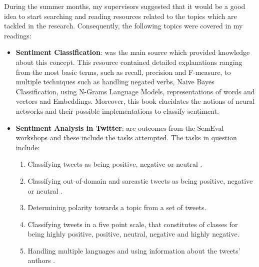 \documentclass{article}
\begin{document}
	During the summer months, my supervisors suggested that it would be a good idea to start searching and reading resources related to the topics which are tackled in the research. Consequently, the following topics were covered in my readings:
	
	\begin{itemize}
	\item \textbf{Sentiment Classification}: \cite{nn} was the main source which provided knowledge about this concept. This resource contained detailed explanations ranging from the most basic terms, such as recall, precision and F-measure, to multiple techniques such as handling negated verbs, Naive Bayes Classification, using N-Grams Language Models, representations of words and vectors and Embeddings. Moreover, this book elucidates the notions of neural networks and their possible implementations to classify sentiment.
	\item \textbf{Sentiment Analysis in Twitter}: \cite{semeval13, semeval14, semeval15, semeval16, semeval17} are outcomes from the SemEval\cite{semeval} workshops and these include the tasks attempted. The tasks in question include: 
	\begin{enumerate}
	\item Classifying tweets as being positive, negative or neutral \cite{semeval13}.
	\item Classifying out-of-domain and sarcastic tweets as being positive, negative or neutral \cite{semeval14}.
	\item Determining polarity towards a topic from a set of tweets\cite{semeval15}.
	\item Classifying tweets in a five point scale, that constitutes of classes for being highly positive, positive, neutral, negative and highly negative\cite{semeval16}.
	\item Handling multiple languages and using information about the tweets' authors \cite{semeval17}.
	\end{enumerate}
	

\end{itemize}
\end{document}
